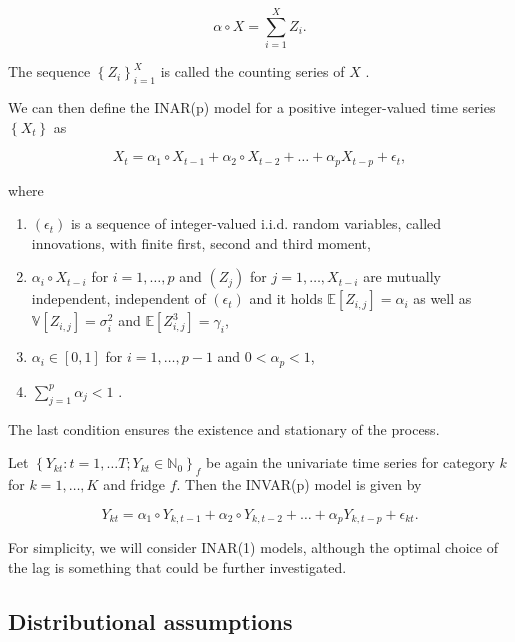 \begin{equation}
\alpha \circ X = \sum_{i=1}^X Z_i .
\label{eq:Thinning operator}
\end{equation}

The sequence  $\left\{Z_i \right\}_{i=1}^X$ is called the counting series of $X$ \cite{Silva:2005}. 

We can then define the INAR(p) model for a positive integer-valued time series $\left\{X_t \right\}$ as

\begin{equation}
X_t = \alpha_1 \circ X_{t-1} + \alpha_2 \circ X_{t-2} + \ldots + \alpha_p X_{t-p} +\epsilon_t ,
\label{eq:Inar(p) model}
\end{equation}

where

\begin{enumerate}
	\item $(\epsilon_t)$ is a sequence of integer-valued i.i.d. random variables, called innovations, with finite first, second and third moment, 
	\item $\alpha_i \circ X_{t-i}$ for $i= 1,\ldots,p$ and $(Z_j)$ for $j=1,\ldots,X_{t-i}$ are mutually independent, independent of $(\epsilon_t)$ and it holds $\mathbb{E}[Z_{i,j}]=\alpha_i$ as well as $\mathbb{V}[Z_{i,j}] = \sigma_i^2$ and $\mathbb{E}[Z_{i,j}^3] = \gamma_i$,
	\item $\alpha_i \in [0,1]$ for $i=1,\ldots,p-1$ and $0 < \alpha_p < 1$,
	\item $\sum_{j=1}^p \alpha_j < 1$ \cite{Silva:2005}. 
\end{enumerate}


The last condition ensures the existence and stationary of the process. 

Let $\left\{Y_{kt}:t=1,\ldots T; Y_{kt} \in \mathbb{N}_0\right\}_f$ be again the univariate time series for category $k$ for $k=1,\ldots,K$ and fridge $f$. Then the INVAR(p) model is given by

\begin{equation}
Y_{kt} = \alpha_1 \circ Y_{k,t-1} + \alpha_2 \circ Y_{k,t-2} + \ldots + \alpha_p Y_{k,t-p} +\epsilon_{kt}.
\label{eq:Inar(p) model ts}
\end{equation}

For simplicity, we will consider INAR(1) models, although the optimal choice of the lag is something that could be further investigated. 

\subsection{Distributional assumptions}
\label{sec: Inar Distributional assumptions}

